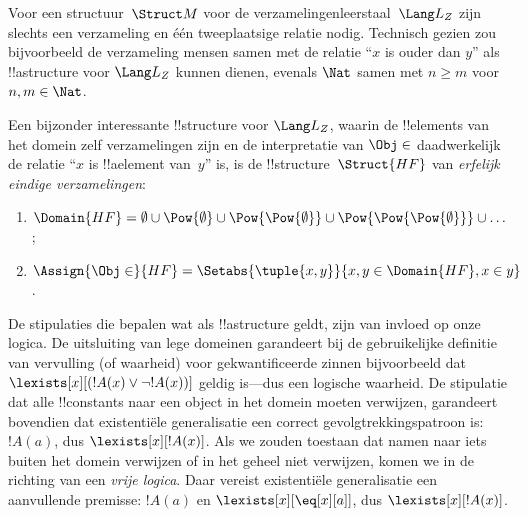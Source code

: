 \documentclass[openany]{memoir}
\begin{document}
\begin{ex}
Voor een structuur~$\Struct M$ voor de verzamelingenleerstaal~$\Lang
L_Z$ zijn slechts een verzameling en één tweeplaatsige relatie nodig.
Technisch gezien zou bijvoorbeeld de verzameling mensen samen met de
relatie ``$x$ is ouder dan $y$'' als !!a{structure} voor $\Lang L_Z$
kunnen dienen, evenals $\Nat$ samen met $n \ge m$ voor $n, m \in \Nat$.

Een bijzonder interessante !!{structure} voor $\Lang L_Z$, waarin de
!!{element}s van het domein zelf verzamelingen zijn en de interpretatie
van $\Obj \in$ daadwerkelijk de relatie ``$x$ is !!a{element} van~$y$''
is, is de !!{structure}~$\Struct{{HF}}$ van \emph{erfelijk eindige
verzamelingen}:
\begin{enumerate}
\item $\Domain{{{HF}}} = \emptyset \cup \Pow{\emptyset} \cup
  \Pow{\Pow{\emptyset}} \cup \Pow{\Pow{\Pow{\emptyset}}} \cup \dots$;
\item $\Assign{\Obj \in}{{{HF}}} = \Setabs{\tuple{x, y}}{x, y \in
  \Domain{{{HF}}}, x \in y}$.
\end{enumerate}
\end{ex}

\begin{digress}
De stipulaties die bepalen wat als !!a{structure} geldt, zijn van
invloed op onze logica. De uitsluiting van lege domeinen garandeert bij
de gebruikelijke definitie van vervulling (of waarheid) voor
gekwantificeerde zinnen bijvoorbeeld dat
$\lexists[x][(!A(x) \lor \lnot !A(x))]$ geldig is---dus een logische
waarheid. De stipulatie dat alle !!{constant}s naar een object in het
domein moeten verwijzen, garandeert bovendien dat existentiële
generalisatie een correct gevolgtrekkingspatroon is: $!A(a)$, dus
$\lexists[x][!A(x)]$. Als we zouden toestaan dat namen naar iets buiten
het domein verwijzen of in het geheel niet verwijzen, komen we in de
richting van een \emph{vrije logica}. Daar vereist existentiële
generalisatie een aanvullende premisse: $!A(a)$ en
$\lexists[x][\eq[x][a]]$, dus $\lexists[x][!A(x)]$.
\end{digress}
\endgroup

\begingroup
\def\olfilename{OLP-0162}
\def\olfilepath{content/first-order-logic/syntax-and-semantics/}
\hypertarget{unit-OLP-0162}{}
\end{document}
